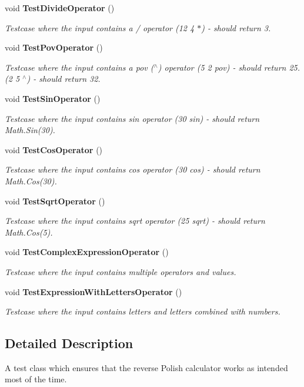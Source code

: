 \begin{DoxyCompactItemize}
void {\bf Test\+Divide\+Operator} ()
\begin{DoxyCompactList}\small\item\em Testcase where the input contains a / operator (12 4 $\ast$) -\/ should return 3. \end{DoxyCompactList}\item 
void {\bf Test\+Pov\+Operator} ()
\begin{DoxyCompactList}\small\item\em Testcase where the input contains a pov ($^\wedge$) operator (5 2 pov) -\/ should return 25. (2 5 $^\wedge$) -\/ should return 32. \end{DoxyCompactList}\item 
void {\bf Test\+Sin\+Operator} ()
\begin{DoxyCompactList}\small\item\em Testcase where the input contains sin operator (30 sin) -\/ should return Math.\+Sin(30). \end{DoxyCompactList}\item 
void {\bf Test\+Cos\+Operator} ()
\begin{DoxyCompactList}\small\item\em Testcase where the input contains cos operator (30 cos) -\/ should return Math.\+Cos(30). \end{DoxyCompactList}\item 
void {\bf Test\+Sqrt\+Operator} ()
\begin{DoxyCompactList}\small\item\em Testcase where the input contains sqrt operator (25 sqrt) -\/ should return Math.\+Cos(5). \end{DoxyCompactList}\item 
void {\bf Test\+Complex\+Expression\+Operator} ()
\begin{DoxyCompactList}\small\item\em Testcase where the input contains multiple operators and values. \end{DoxyCompactList}\item 
void {\bf Test\+Expression\+With\+Letters\+Operator} ()
\begin{DoxyCompactList}\small\item\em Testcase where the input contains letters and letters combined with numbers. \end{DoxyCompactList}\end{DoxyCompactItemize}


\subsection{Detailed Description}
A test class which ensures that the reverse Polish calculator works as intended most of the time. 



